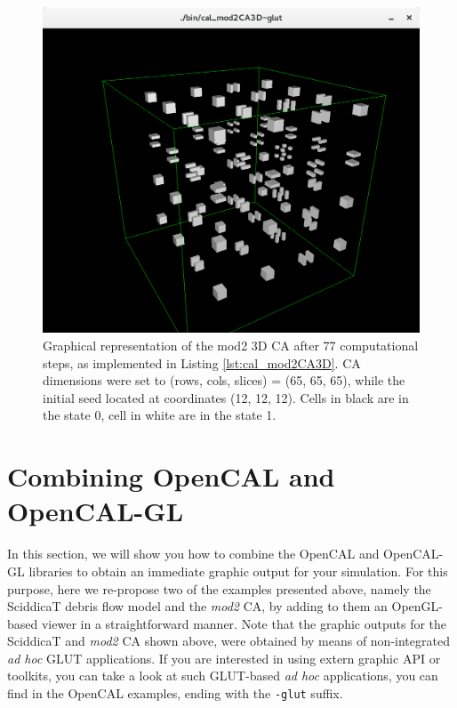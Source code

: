 \begin{figure}
  \begin{center}
    \includegraphics[width=12cm]{./images/OpenCAL/mod23DCA-glut}
    \caption{Graphical representation of the mod2 3D CA after 77 computational steps, as implemented in Listing \ref{lst:cal_mod2CA3D}. CA dimensions were set to (rows, cols, slices) = (65, 65, 65), while the initial seed located at coordinates (12, 12, 12). Cells in black are in the state 0, cell in white are in the state 1.}
    \label{fig:cal_mod2CA3D}
  \end{center}
\end{figure}


\section{Combining OpenCAL and OpenCAL-GL}\label{sec:combining_gl}

In this section, we will show you how to combine the OpenCAL and
OpenCAL-GL libraries to obtain an immediate graphic output for your
simulation. For this purpose, here we re-propose two of the examples
presented above, namely the SciddicaT debris flow model and the
\emph{mod2} CA, by adding to them an OpenGL-based viewer in a
straightforward manner. Note that the graphic outputs for the
SciddicaT and \emph{mod2} CA shown above, were obtained by means of
non-integrated \emph{ad hoc} GLUT applications. If you are interested
in using extern graphic API or toolkits, you can take a look at such
GLUT-based \emph{ad hoc} applications, you can find in the OpenCAL
examples, ending with the \verb'-glut' suffix.

